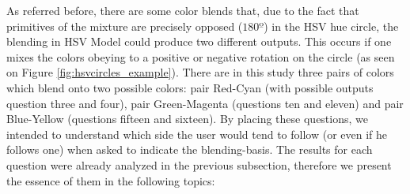 %
As referred before, there are some color blends that, due to the fact that primitives of the mixture are precisely opposed ($180º$) in the HSV hue circle, the blending in HSV Model could produce two different outputs.
This occurs if one mixes the colors obeying to a positive or negative rotation on the circle (as seen on Figure \ref{fig:hsvcircles_example}). There are in this study three pairs of colors which blend onto two possible
colors: pair Red-Cyan (with possible outputs question three and four), pair Green-Magenta (questions ten and eleven) and pair Blue-Yellow (questions fifteen and sixteen). By placing these questions, we intended to
understand which side the user would tend to follow (or even if he follows one) when asked to indicate the blending-basis. The results for each question were already analyzed in the previous subsection, therefore we
present the essence of them in the following topics:
%
